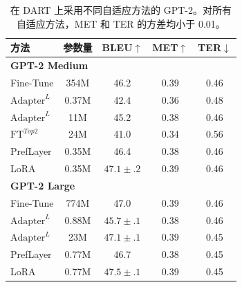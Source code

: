 \documentclass[11pt,UTF8,fontset=fandol]{ctexart}
\begin{document}
\begin{table}[H]\centering
\caption{在 DART 上采用不同自适应方法的 GPT-2。对所有自适应方法，MET 和 TER 的方差均小于 0.01。}
\label{tab:13}
\begin{tabular}{lcccc}
\toprule
方法 & 参数量 & BLEU$\uparrow$ & MET$\uparrow$ & TER$\downarrow$ \\
\midrule
\multicolumn{5}{l}{\textbf{GPT-2 Medium}} \\
Fine-Tune & 354M & 46.2 & 0.39 & 0.46 \\
$\text{Adapter}^L$ & 0.37M & 42.4 & 0.36 & 0.48 \\
$\text{Adapter}^L$ & 11M & 45.2 & 0.38 & 0.46 \\
$\text{FT}^{Top2}$ & 24M & 41.0 & 0.34 & 0.56 \\
PrefLayer & 0.35M & 46.4 & 0.38 & 0.46 \\
LoRA & 0.35M & $47.1\pm.2$ & 0.39 & 0.46 \\
\midrule
\multicolumn{5}{l}{\textbf{GPT-2 Large}} \\
Fine-Tune & 774M & 47.0 & 0.39 & 0.46 \\
$\text{Adapter}^L$ & 0.88M & $45.7\pm.1$ & 0.38 & 0.46 \\
$\text{Adapter}^L$ & 23M & $47.1\pm.1$ & 0.39 & 0.45 \\
PrefLayer & 0.77M & 46.7 & 0.38 & 0.45 \\
LoRA & 0.77M & $47.5\pm.1$ & 0.39 & 0.45 \\
\bottomrule
\end{tabular}
\end{table}
\end{document}
